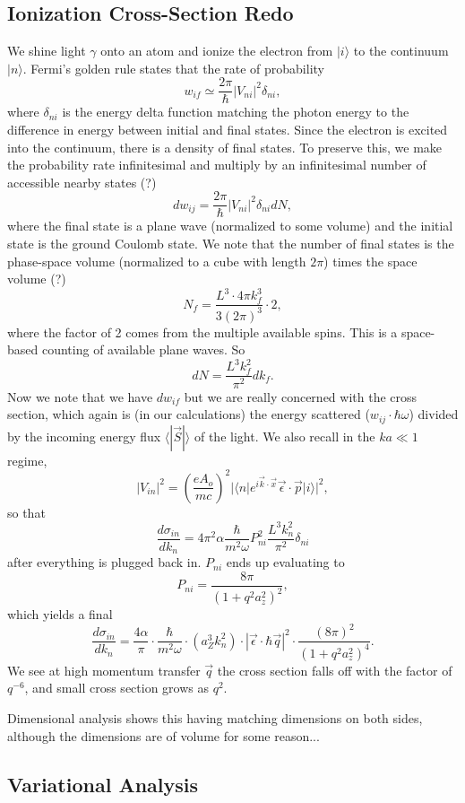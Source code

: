\documentclass[fontsize=12pt]{scrartcl}
\newcommand{\la}{\langle}
\newcommand{\ra}{\rangle}
\begin{document}
\subsection{Ionization Cross-Section Redo}
We shine light $\gamma$ onto an atom and ionize the electron from $|i\ra$ to the continuum $|n\ra$. Fermi's golden rule states that the rate of probability $$w_{if}\simeq \frac{2\pi}{\hbar}|V_{ni}|^2\delta_{ni},$$ where $\delta_{ni}$ is the energy delta function matching the photon energy to the difference in energy between initial and final states. Since the electron is excited into the continuum, there is a density of final states. To preserve this, we make the probability rate infinitesimal and multiply by an infinitesimal number of accessible nearby states (?) $$dw_{ij}= \frac{2\pi}{\hbar}|V_{ni}|^2 \delta_{ni}dN,$$ where the final state is a plane wave (normalized to some volume) and the initial state is the ground Coulomb state. We note that the number of final states is the phase-space volume (normalized to a cube with length $2\pi$) times the space volume (?) $$N_f=\frac{L^3\cdot 4\pi k_f^3}{3(2\pi)^3}\cdot 2,$$ where the factor of 2 comes from the multiple available spins. This is a space-based counting of available plane waves. So $$dN=\frac{L^3k_f^2}{\pi^2}dk_f.$$ Now we note that we have $dw_{if}$ but we are really concerned with the cross section, which again is (in our calculations) the energy scattered ($w_{ij}\cdot\hbar\omega$) divided by the incoming energy flux $\la|\vec{S}|\ra$ of the light. We also recall in the $ka\ll 1$ regime, $$|V_{in}|^2 = \left(\frac{eA_o}{mc}\right)^2 |\la n|e^{i\vec{k}\cdot\vec{x}}\vec{\epsilon}\cdot\vec{p}|i\ra|^2,$$ so that $$\frac{d\sigma_{in}}{dk_n} = 4\pi^2\alpha \frac{\hbar}{m^2\omega} P_{ni}^2 \frac{L^3k_n^2}{\pi^2}\delta_{ni}$$ after everything is plugged back in. $P_{ni}$ ends up evaluating to $$P_{ni}=\frac{8\pi}{(1+q^2a_z^2)^2},$$ which yields a final $$\frac{d\sigma_{in}}{dk_n} = \frac{4\alpha}{\pi}\cdot\frac{\hbar}{m^2\omega}\cdot(a_Z^3k_n^2)\cdot|\vec{\epsilon}\cdot\hbar\vec{q}|^2\cdot\frac{(8\pi)^2}{(1+q^2a_z^2)^4}.$$ We see at high momentum transfer $\vec{q}$ the cross section falls off with the factor of $q^{-6}$, and small cross section grows as $q^2$. 

Dimensional analysis shows this having matching dimensions on both sides, although the dimensions are of volume for some reason...

\subsection{Variational Analysis}
\end{document}
